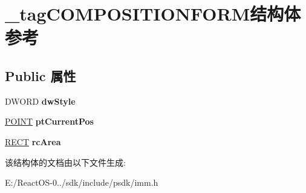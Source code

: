 \hypertarget{struct__tag_c_o_m_p_o_s_i_t_i_o_n_f_o_r_m}{}\section{\+\_\+tag\+C\+O\+M\+P\+O\+S\+I\+T\+I\+O\+N\+F\+O\+R\+M结构体 参考}
\label{struct__tag_c_o_m_p_o_s_i_t_i_o_n_f_o_r_m}
\subsection*{Public 属性}
\begin{DoxyCompactItemize}
\item 
\mbox{\label{struct__tag_c_o_m_p_o_s_i_t_i_o_n_f_o_r_m_aa254ad045186f1f29cb3dcd1c2c95874}} 
D\+W\+O\+RD {\bfseries dw\+Style}
\item 
\mbox{\label{struct__tag_c_o_m_p_o_s_i_t_i_o_n_f_o_r_m_aebfe67ad95825777d0ac6eb8dee11d5b}} 
\hyperlink{structtag_p_o_i_n_t}{P\+O\+I\+NT} {\bfseries pt\+Current\+Pos}
\item 
\mbox{\label{struct__tag_c_o_m_p_o_s_i_t_i_o_n_f_o_r_m_a703387e71496add9e9f2d743a0710ed9}} 
\hyperlink{structtag_r_e_c_t}{R\+E\+CT} {\bfseries rc\+Area}
\end{DoxyCompactItemize}


该结构体的文档由以下文件生成\+:\begin{DoxyCompactItemize}
\item 
E\+:/\+React\+O\+S-\/0../sdk/include/psdk/imm.\+h\end{DoxyCompactItemize}
